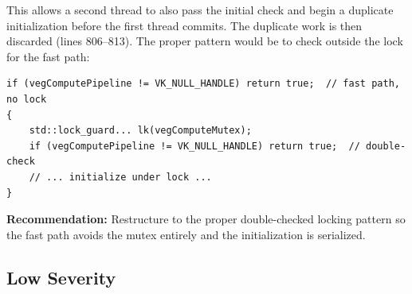 \documentclass[a4paper,12pt]{article}
\begin{document}
\begin{enumerate}[leftmargin=*]
  This allows a second thread to also pass the initial check and begin a
  duplicate initialization before the first thread commits. The duplicate
  work is then discarded (lines 806--813). The proper pattern would be to
  check outside the lock for the fast path:
\begin{lstlisting}
if (vegComputePipeline != VK_NULL_HANDLE) return true;  // fast path, no lock
{
    std::lock_guard... lk(vegComputeMutex);
    if (vegComputePipeline != VK_NULL_HANDLE) return true;  // double-check
    // ... initialize under lock ...
}
\end{lstlisting}

  \textbf{Recommendation:}
  Restructure to the proper double-checked locking pattern so the fast path
  avoids the mutex entirely and the initialization is serialized.

\end{enumerate}

\newpage

\subsection{Low Severity}
\end{document}
